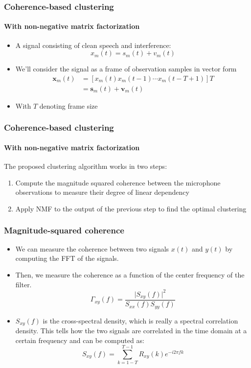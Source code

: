 \documentclass[aspectratio=169]{beamer}
\begin{document}
\begin{frame}
\frametitle{Coherence-based clustering}
\framesubtitle{With non-negative matrix factorization}
\begin{itemize}
    \item A signal consisting of clean speech and interference:
    \begin{equation}
        x_m(t) = s_m(t) + v_m(t)
    \end{equation}
    \item We'll consider the signal as a frame of observation samples in vector form
    \begin{align*}
        \pmb x_m(t) &= [x_m(t)x_m(t - 1) \cdots x_m(t - T + 1)]T  \\
        &= \pmb s_m(t) + \pmb v_m(t)
    \end{align*}
    \item With $T$ denoting frame size
    
\end{itemize}
\end{frame}

\begin{frame}
\frametitle{Coherence-based clustering}
\framesubtitle{With non-negative matrix factorization}

The proposed clustering algorithm works in two steps:
\begin{enumerate}
    \item Compute the magnitude squared coherence between the microphone observations to measure their degree of linear dependency
    \item Apply NMF to the output of the previous step to find the optimal clustering
\end{enumerate}
\end{frame}


\begin{frame}
\frametitle{Magnitude-squared coherence}

\begin{itemize}
    \item We can measure the coherence between two signals $x(t)$ and $y(t)$ by computing the FFT of the signals. 
    \item Then, we measure the coherence as a function of the center frequency of the filter.
    \begin{equation}
        \Gamma_{xy}(f) = \frac{\lvert S_{xy}(f)\rvert ^2}{S_{xx}(f)S_{yy}(f)}
    \end{equation}
    \item $S_{xy}(f)$ is the cross-spectral density, which is really a spectral correlation density. This tells how the two signals are correlated in the time domain at a certain frequency and can be computed as:
    \begin{equation}
        S_{xy}(f) = \sum_{k=1-T}^{T-1} R_{xy}(k)e^{-i2\pi fk}
    \end{equation}
\end{itemize}
\end{frame}
\end{document}
